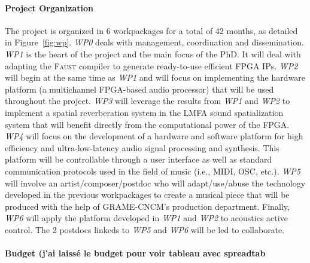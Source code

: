 \documentclass[a4paper,10pt]{article}
\newcommand{\F}{\textsc{Faust}}
\begin{document}
\paragraph{Project Organization}


The project is organized in 6 workpackages for a total of 42 months, as detailed in Figure~\ref{fig:wp}. \textit{WP0} deals with management, coordination and dissemination. \textit{WP1} is the heart of the project and the main focus of the PhD. It will deal with adapting the \F{} compiler to generate ready-to-use efficient FPGA IPs. \textit{WP2} will begin at the same time as \textit{WP1} and will focus on implementing the hardware platform (a multichannel FPGA-based audio processor) that will be used throughout the project. \textit{WP3} will leverage the results from \textit{WP1} and \textit{WP2} to implement a spatial reverberation system in the LMFA sound spatialization system that will benefit directly from the computational power of the FPGA. %
\textit{WP4} will focus on the development of a hardware and software platform for high efficiency and ultra-low-latency audio signal processing and synthesis. This platform will be controllable through a user interface as well as standard communication protocols used in the field of music (i.e., MIDI, OSC, etc.).
\textit{WP5} will involve an artist/composer/postdoc who will adapt/use/abuse the technology developed in the previous workpackages to create a musical piece that will be produced with the help of GRAME-CNCM's production department. %
Finally, \textit{WP6} will apply the platform developed in \textit{WP1} and \textit{WP2} to acoustics active control. The 2 postdocs linkeds to \textit{WP5} and \textit{WP6} will be led to collaborate. 

\paragraph{Budget (j'ai laissé le budget pour voir tableau avec spreadtab}

\end{document}
